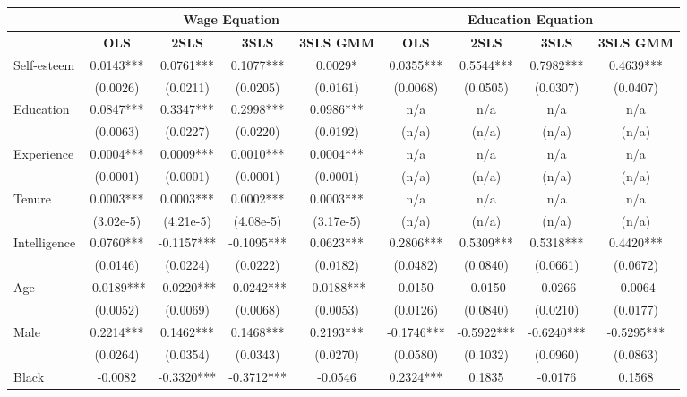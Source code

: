 \documentclass[12pt]{report}
\newcommand{\prbf}[1]{\textbf{#1}}
\begin{document}
\begin{sidewaystable}
\small
\caption{\label{tab:wage06}}
\vspace{2pt}
\centering\begin{tabular}{lc|c|c|c|c|c|c|c}
\hline
\hline
& \multicolumn{4}{|c|}{Wage Equation} & \multicolumn{4}{|c}{Education Equation}\\
\hline
& \prbf{OLS} & \prbf{2SLS} & \prbf{3SLS} & \prbf{3SLS GMM} & \prbf{OLS} & \prbf{2SLS} & \prbf{3SLS} & \prbf{3SLS GMM}\\
\hline
Self-esteem & 0.0143*** & 0.0761*** & 0.1077*** & 0.0029* & 0.0355*** & 0.5544*** & 0.7982*** & 0.4639***\\
& (0.0026) & (0.0211) & (0.0205) & (0.0161) & (0.0068) & (0.0505) & (0.0307) & (0.0407)\\
Education & 0.0847*** & 0.3347*** & 0.2998*** & 0.0986*** & n/a & n/a & n/a & n/a\\
& (0.0063) & (0.0227) & (0.0220) & (0.0192) & (n/a) & (n/a) & (n/a) & (n/a)\\
Experience & 0.0004*** & 0.0009*** & 0.0010*** & 0.0004*** & n/a & n/a & n/a & n/a\\
& (0.0001) & (0.0001) & (0.0001) & (0.0001) & (n/a) & (n/a) & (n/a) & (n/a)\\
Tenure & 0.0003*** & 0.0003*** & 0.0002*** & 0.0003*** & n/a & n/a & n/a & n/a\\
& (3.02e-5) & (4.21e-5) & (4.08e-5) & (3.17e-5) & (n/a) & (n/a) & (n/a) & (n/a)\\
Intelligence & 0.0760*** & -0.1157*** & -0.1095*** & 0.0623*** & 0.2806*** & 0.5309*** & 0.5318*** & 0.4420***\\
& (0.0146) & (0.0224) & (0.0222) & (0.0182) & (0.0482) & (0.0840) & (0.0661) & (0.0672)\\
Age & -0.0189*** & -0.0220*** & -0.0242*** & -0.0188*** & 0.0150 & -0.0150 & -0.0266 & -0.0064\\
& (0.0052) & (0.0069) & (0.0068) & (0.0053) & (0.0126) & (0.0840) & (0.0210) & (0.0177)\\
Male & 0.2214*** & 0.1462*** & 0.1468*** & 0.2193*** & -0.1746*** & -0.5922*** & -0.6240*** & -0.5295***\\
& (0.0264) & (0.0354) & (0.0343) & (0.0270) & (0.0580) & (0.1032) & (0.0960) & (0.0863)\\
Black & -0.0082 & -0.3320*** & -0.3712*** & -0.0546 & 0.2324*** & 0.1835 & -0.0176 & 0.1568\\

\end{tabular}
\end{sidewaystable}
\end{document}

